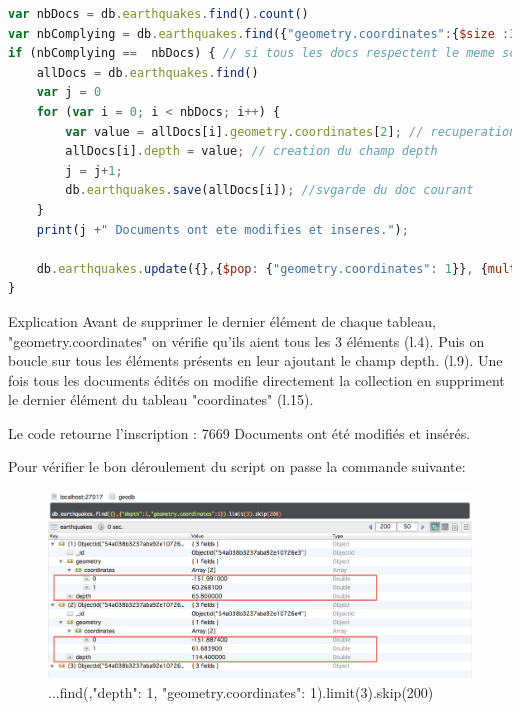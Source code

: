 \begin{lstlisting}[language=Javascript, caption=Création du champ "depth".]
var nbDocs = db.earthquakes.find().count()
var nbComplying = db.earthquakes.find({"geometry.coordinates":{$size :3}}).count()
if (nbComplying ==  nbDocs) { // si tous les docs respectent le meme schema
    allDocs = db.earthquakes.find()
    var j = 0
    for (var i = 0; i < nbDocs; i++) { 
        var value = allDocs[i].geometry.coordinates[2]; // recuperation de la valeur
        allDocs[i].depth = value; // creation du champ depth
        j = j+1;
        db.earthquakes.save(allDocs[i]); //svgarde du doc courant
    }
    print(j +" Documents ont ete modifies et inseres.");

    db.earthquakes.update({},{$pop: {"geometry.coordinates": 1}}, {multi: true});
}
\end{lstlisting}

\begin{block}{Explication} Avant de supprimer le dernier élément de chaque tableau, "geometry.coordinates" on vérifie qu'ils aient tous les 3 éléments (l.4). Puis on boucle sur tous les éléments présents en leur ajoutant le champ depth. (l.9). Une fois tous les documents édités on modifie directement la collection en suppriment le dernier élément du tableau "coordinates" (l.15).
\end{block}

Le code retourne l'inscription : 7669 Documents ont été modifiés et insérés. \newline 

Pour vérifier le bon déroulement du script on passe la commande suivante: 

\begin{figure}[h!]

    \includegraphics[scale=0.4]{img/depth.png}
    \caption{...find({},{"depth": 1, "geometry.coordinates": 1}).limit(3).skip(200)}
    \end{figure}

